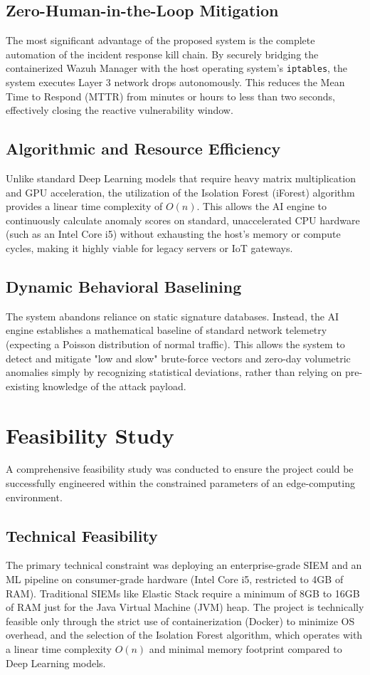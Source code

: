 \documentclass[12pt, a4paper]{report}
\begin{document}
	\subsection{Zero-Human-in-the-Loop Mitigation}
	The most significant advantage of the proposed system is the complete automation of the incident response kill chain. By securely bridging the containerized Wazuh Manager with the host operating system's \texttt{iptables}, the system executes Layer 3 network drops autonomously. This reduces the Mean Time to Respond (MTTR) from minutes or hours to less than two seconds, effectively closing the reactive vulnerability window.
	
	\subsection{Algorithmic and Resource Efficiency}
	Unlike standard Deep Learning models that require heavy matrix multiplication and GPU acceleration, the utilization of the Isolation Forest (iForest) algorithm provides a linear time complexity of $O(n)$. This allows the AI engine to continuously calculate anomaly scores on standard, unaccelerated CPU hardware (such as an Intel Core i5) without exhausting the host's memory or compute cycles, making it highly viable for legacy servers or IoT gateways.
	
	\subsection{Dynamic Behavioral Baselining}
	The system abandons reliance on static signature databases. Instead, the AI engine establishes a mathematical baseline of standard network telemetry (expecting a Poisson distribution of normal traffic). This allows the system to detect and mitigate "low and slow" brute-force vectors and zero-day volumetric anomalies simply by recognizing statistical deviations, rather than relying on pre-existing knowledge of the attack payload.
	
	\section{Feasibility Study}
	A comprehensive feasibility study was conducted to ensure the project could be successfully engineered within the constrained parameters of an edge-computing environment.
	
	\subsection{Technical Feasibility}
	The primary technical constraint was deploying an enterprise-grade SIEM and an ML pipeline on consumer-grade hardware (Intel Core i5, restricted to 4GB of RAM). Traditional SIEMs like Elastic Stack require a minimum of 8GB to 16GB of RAM just for the Java Virtual Machine (JVM) heap. The project is technically feasible only through the strict use of containerization (Docker) to minimize OS overhead, and the selection of the Isolation Forest algorithm, which operates with a linear time complexity $O(n)$ and minimal memory footprint compared to Deep Learning models.
	
\end{document}
